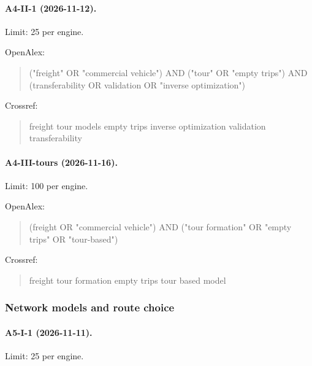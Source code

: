 \paragraph{A4-II-1 (2026-11-12).} Limit: 25 per engine.

\noindent OpenAlex:

\begin{quote}\footnotesize\ttfamily\raggedright

("freight" OR "commercial vehicle") AND ("tour" OR "empty trips") AND (transferability OR validation OR "inverse optimization")

\end{quote}

\noindent Crossref:

\begin{quote}\footnotesize\ttfamily\raggedright

freight tour models empty trips inverse optimization validation transferability

\end{quote}

\paragraph{A4-III-tours (2026-11-16).} Limit: 100 per engine.

\noindent OpenAlex:

\begin{quote}\footnotesize\ttfamily\raggedright

(freight OR "commercial vehicle") AND ("tour formation" OR "empty trips" OR "tour-based")

\end{quote}

\noindent Crossref:

\begin{quote}\footnotesize\ttfamily\raggedright

freight tour formation empty trips tour based model

\end{quote}

\subsubsection{Network models and route choice}

\paragraph{A5-I-1 (2026-11-11).} Limit: 25 per engine.

